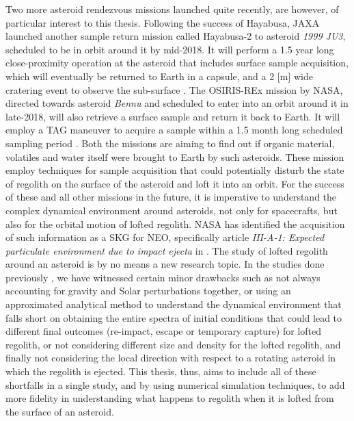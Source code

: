 Two more asteroid rendezvous missions launched quite recently, are however, of particular interest to this thesis. Following the success of Hayabusa, \gls{JAXA} launched another sample return mission called Hayabusa-2 to asteroid \textit{1999 JU3}, scheduled to be in orbit around it by mid-2018. It will perform a 1.5 year long close-proximity operation at the asteroid that includes surface sample acquisition, which will eventually be returned to Earth in a capsule, and a 2 [m] wide cratering event to observe the sub-surface \parencite{TsudaHayabusa2SystemDesign}. The \gls{OSIRIS-REx} mission by \gls{NASA}, directed towards asteroid \textit{Bennu} and scheduled to enter into an orbit around it in late-2018, will also retrieve a surface sample and return it back to Earth. It will employ a \gls{TAG} maneuver to acquire a sample within a 1.5 month long scheduled sampling period \parencite{berry2013osiris}. Both the missions are aiming to find out if organic material, volatiles and water itself were brought to Earth by such asteroids. These mission employ techniques for sample acquisition that could potentially disturb the state of regolith on the surface of the asteroid and loft it into an orbit. For the success of these and all other missions in the future, it is imperative to understand the complex dynamical environment around asteroids, not only for spacecrafts, but also for the orbital motion of lofted regolith. \gls{NASA} has identified the acquisition of such information as a \gls{SKG} for \gls{NEO}, specifically article \textit{III-A-1: Expected particulate environment due to impact ejecta} in \cite{nasa_skg}.
%
\newline\newline
%
The study of lofted regolith around an asteroid is by no means a new research topic. In the studies done previously \parencite{richter1995stability,lee1996dust,scheeres1996orbits,scheeres2000ejecta,korycansky2004_impactEjecta,yarnoz2014passive}, we have witnessed certain minor drawbacks such as not always accounting for gravity and Solar perturbations together, or using an approximated analytical method to understand the dynamical environment that falls short on obtaining the entire spectra of initial conditions that could lead to different final outcomes (re-impact, escape or temporary capture) for lofted regolith, or not considering different size and density for the lofted regolith, and finally not considering the local direction with respect to a rotating asteroid in which the regolith is ejected. This thesis, thus, aims to include all of these shortfalls in a single study, and by using numerical simulation techniques, to add more fidelity in understanding what happens to regolith when it is lofted from the surface of an asteroid.
